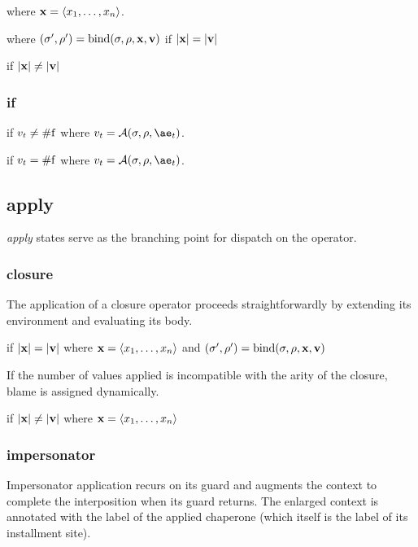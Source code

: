 \noindent
where $\mathbf{x}=\langle x_1,\dots,x_n\rangle$.


\noindent
where $(\sigma',\rho')=\mathrm{bind}(\sigma,\rho,\mathbf{x},\mathbf{v})$ if $|\mathbf{x}|=|\mathbf{v}|$

 if $|\mathbf{x}|\ne|\mathbf{v}|$

\subsubsection{if}

if $v_t\ne\mathrm{\#f}$
where $v_t=\A{\sigma}{\rho}{\ae_t}$.

if $v_t=\mathrm{\#f}$
where $v_t=\A{\sigma}{\rho}{\ae_t}$.

\subsection{apply}

\emph{apply} states serve as the branching point for dispatch on the operator.

\subsubsection{closure}

The application of a closure operator proceeds straightforwardly by extending its environment and evaluating its body.

if $|\mathbf{x}|=|\mathbf{v}|$ where $\mathbf{x}=\langle x_1,\dots,x_n\rangle$ and $(\sigma',\rho')=\mathrm{bind}(\sigma,\rho,\mathbf{x},\mathbf{v})$

If the number of values applied is incompatible with the arity of the closure, blame is assigned dynamically.

if $|\mathbf{x}|\ne|\mathbf{v}|$ where $\mathbf{x}=\langle x_1,\dots,x_n\rangle$

\subsubsection{impersonator}

Impersonator application recurs on its guard and augments the context to complete the interposition when its guard returns.
The enlarged context is annotated with the label of the applied chaperone (which itself is the label of its installment site).

